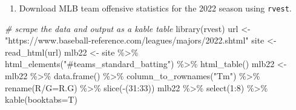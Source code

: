 \documentclass[
  11pt,
]{book}
\newenvironment{Shaded}{\begin{snugshade}}{\end{snugshade}}
\newcommand{\AttributeTok}[1]{\textcolor[rgb]{0.77,0.63,0.00}{#1}}
\newcommand{\CommentTok}[1]{\textcolor[rgb]{0.56,0.35,0.01}{\textit{#1}}}
\newcommand{\DecValTok}[1]{\textcolor[rgb]{0.00,0.00,0.81}{#1}}
\newcommand{\FunctionTok}[1]{\textcolor[rgb]{0.00,0.00,0.00}{#1}}
\newcommand{\NormalTok}[1]{#1}
\newcommand{\OtherTok}[1]{\textcolor[rgb]{0.56,0.35,0.01}{#1}}
\newcommand{\SpecialCharTok}[1]{\textcolor[rgb]{0.00,0.00,0.00}{#1}}
\newcommand{\StringTok}[1]{\textcolor[rgb]{0.31,0.60,0.02}{#1}}
\providecommand{\tightlist}{%
  \setlength{\itemsep}{0pt}\setlength{\parskip}{0pt}}
\theoremstyle{definition}
\theoremstyle{definition}
\theoremstyle{definition}
\theoremstyle{definition}
\theoremstyle{remark}
\begin{document}
\begin{enumerate}
\def\labelenumi{(\alph{enumi})}
\tightlist
\item
  Download MLB team offensive statistics for the 2022 season using \texttt{rvest}.
\end{enumerate}

\begin{Shaded}
\begin{Highlighting}[]
\CommentTok{\# scrape the data and output as a kable table}
\FunctionTok{library}\NormalTok{(rvest)}
\NormalTok{url }\OtherTok{\textless{}{-}} \StringTok{"https://www.baseball{-}reference.com/leagues/majors/2022.shtml"}
\NormalTok{site }\OtherTok{\textless{}{-}} \FunctionTok{read\_html}\NormalTok{(url)}
\NormalTok{mlb22 }\OtherTok{\textless{}{-}}\NormalTok{ site }\SpecialCharTok{\%\textgreater{}\%} \FunctionTok{html\_elements}\NormalTok{(}\StringTok{"\#teams\_standard\_batting"}\NormalTok{) }\SpecialCharTok{\%\textgreater{}\%} \FunctionTok{html\_table}\NormalTok{()}
\NormalTok{mlb22 }\OtherTok{\textless{}{-}}\NormalTok{ mlb22 }\SpecialCharTok{\%\textgreater{}\%} \FunctionTok{data.frame}\NormalTok{() }\SpecialCharTok{\%\textgreater{}\%} \FunctionTok{column\_to\_rownames}\NormalTok{(}\StringTok{"Tm"}\NormalTok{) }\SpecialCharTok{\%\textgreater{}\%}
  \FunctionTok{rename}\NormalTok{(}\StringTok{\textasciigrave{}}\AttributeTok{R/G}\StringTok{\textasciigrave{}}\OtherTok{=}\NormalTok{R.G) }\SpecialCharTok{\%\textgreater{}\%} \FunctionTok{slice}\NormalTok{(}\SpecialCharTok{{-}}\NormalTok{(}\DecValTok{31}\SpecialCharTok{:}\DecValTok{33}\NormalTok{))}
\NormalTok{mlb22 }\SpecialCharTok{\%\textgreater{}\%} \FunctionTok{select}\NormalTok{(}\DecValTok{1}\SpecialCharTok{:}\DecValTok{8}\NormalTok{) }\SpecialCharTok{\%\textgreater{}\%} \FunctionTok{kable}\NormalTok{(}\AttributeTok{booktabs=}\NormalTok{T)}
\end{Highlighting}
\end{Shaded}
\end{document}
